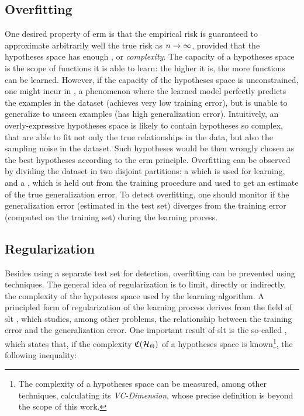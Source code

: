 \subsection{Overfitting}
One desired property of \gls{erm} is that the empirical risk is guaranteed to approximate arbitrarily well the true risk as $n \shortrightarrow \infty$, provided that the hypotheses space has enough , or \emph{complexity}. The capacity of a hypotheses space is the scope of functions it is able to learn: the higher it is, the more  functions can be learned. However, if the capacity of the hypotheses space is unconstrained, one might incur in , a phenomenon where the learned model perfectly predicts the examples in the dataset (achieves very low training error), but is unable to generalize to unseen examples (has high generalization error). Intuitively, an overly-expressive hypotheses space is likely to contain hypotheses so complex, that are able to fit not only the true relationships in the data, but also the sampling noise in the dataset. Such hypotheses would be then wrongly chosen as the best hypotheses according to the \gls{erm} principle. Overfitting can be observed by dividing the dataset in two disjoint partitions: a  which is used for learning, and a , which is held out from the training procedure and used to get an estimate of the true generalization error. To detect overfitting, one should monitor if the generalization error (estimated in the test set) diverges from the training error (computed on the training set) during the learning process.

\subsection{Regularization}
Besides using a separate test set for detection, overfitting can be prevented \apriori using  techniques. The general idea of regularization is to limit, directly or indirectly, the complexity of the hypoteses space used by the learning algorithm. A principled form of regularization of the learning process derives from the field of \gls{slt} \citep{vapnik2000slt}, which studies, among other problems, the relationship between the training error and the generalization error.  One important result of \gls{slt} is the so-called , which states that, if the complexity $\Complexity(\HSpace)$ of a hypotheses space is known\footnote{The complexity of a hypotheses space can be measured, among other techniques, calculating its \emph{VC-Dimension}, whose precise definition is beyond the scope of this work.}, the following inequality:

